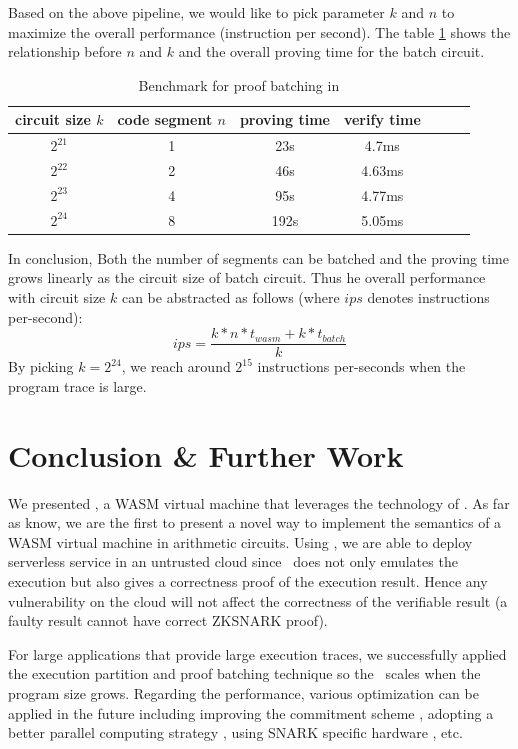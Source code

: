 Based on the above pipeline, we would like to pick parameter $k$ and $n$ to maximize the overall performance (instruction per second). The table \ref{tbl:proof-batching} shows the relationship before $n$ and $k$ and the overall proving time for the batch circuit. 
\begin{table}[!h]
\small
\begin{center}
\caption{Benchmark for proof batching in \zkwasm}
\label{tbl:proof-batching}
\begin{tabular}{ | c | c | c | c | c | c | c| }
  \hline
  circuit size $k$ & code segment $n$ & proving time & verify time \\ 
  \hline
  $2^{21}$ & 1 & 23s & 4.7ms\\
  \hline
  $2^{22}$ & 2 & 46s & 4.63ms\\
  \hline
  $2^{23}$ & 4 & 95s & 4.77ms\\
  \hline
  $2^{24}$ & 8 & 192s & 5.05ms\\
  \hline
\end{tabular}
\end{center}
\end{table}
In conclusion, Both the number of segments can be batched and the proving time grows linearly as the circuit size of batch circuit. Thus he overall performance with circuit size $k$ can be abstracted as follows (where $ips$ denotes instructions per-second):
$$
 ips = \frac{k * n * t_{wasm} + k * t_{batch}}{k}
$$
By picking $k = 2^{24}$, we reach around $2^{15}$ instructions per-seconds when the program trace is large.

\section{Conclusion \& Further Work}
\label{chp:conclusion}
We presented \zkwasm, a WASM virtual machine that leverages the technology of \zksnark. As far as know, we are the first to present a novel way to implement the semantics of a WASM virtual machine in arithmetic circuits. Using \zkwasm, we are able to deploy serverless service in an untrusted cloud since \zkwasm\, does not only emulates the execution but also gives a correctness proof of the execution result. Hence any vulnerability on the cloud will not affect the correctness of the verifiable result (a faulty result cannot have correct ZKSNARK proof).

For large applications that provide large execution traces, we successfully applied the execution partition and proof batching technique so the \zkwasm\, scales when the program size grows. Regarding the performance, various optimization can be applied in the future including improving the commitment scheme \cite{chen2022hyperplonk}, adopting a better parallel computing strategy \cite{wu2018dizk}, using SNARK specific hardware \cite{peng2020design, xavier2022pipemsm}, etc.

